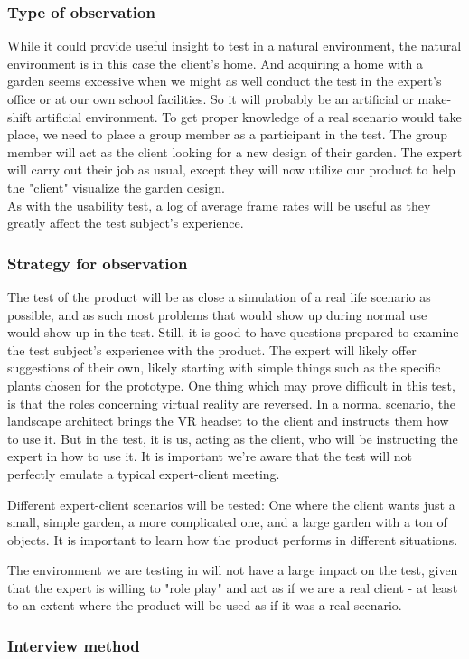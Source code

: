 \subsubsection{Type of observation}
While it could provide useful insight to test in a natural environment, the natural environment is in this case the client's home. And acquiring a home with a garden seems excessive when we might as well conduct the test in the expert's office or at our own school facilities. So it will probably be an artificial or make-shift artificial environment. To get proper knowledge of a real scenario would take place, we need to place a group member as a participant in the test. The group member will act as the client looking for a new design of their garden. The expert will carry out their job as usual, except they will now utilize our product to help the "client" visualize the garden design.\\
As with the usability test, a log of average frame rates will be useful as they greatly affect the test subject's experience. 

\subsubsection{Strategy for observation}
The test of the product will be as close a simulation of a real life scenario as possible, and as such most problems that would show up during normal use would show up in the test. Still, it is good to have questions prepared to examine the test subject's experience with the product. The expert will likely offer suggestions of their own, likely starting with simple things such as the specific plants chosen for the prototype. 
One thing which may prove difficult in this test, is that the roles concerning virtual reality are reversed. In a normal scenario, the landscape architect brings the VR headset to the client and instructs them how to use it. But in the test, it is us, acting as the client, who will be instructing the expert in how to use it. It is important we're aware that the test will not perfectly emulate a typical expert-client meeting. 

Different expert-client scenarios will be tested: One where the client wants just a small, simple garden, a more complicated one, and a large garden with a ton of objects. It is important to learn how the product performs in different situations. 

The environment we are testing in will not have a large impact on the test, given that the expert is willing to "role play" and act as if we are a real client - at least to an extent where the product will be used as if it was a real scenario. 


\subsubsection{Interview method}

\fi